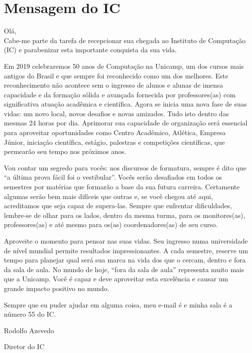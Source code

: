 
\section{Mensagem do IC}

Olá,\\

Cabe-me parte da tarefa de recepcionar sua chegada ao Instituto de Computação 
(IC) e parabenizar esta importante conquista da sua vida.

Em 2019 celebraremos 50 anos de Computação na Unicamp, um dos cursos mais 
antigos do Brasil e que sempre foi reconhecido como um dos melhores. Este 
reconhecimento não acontece sem o ingresso de alunos e alunas de imensa 
capacidade e da formação sólida e avançada fornecida por professores(as) com 
significativa atuação acadêmica e científica. Agora se inicia uma nova fase de 
suas vidas: um novo local, novos desafios e novas amizades. Tudo isto dentro 
das mesmas 24 horas por dia. Aprimorar sua capacidade de organização será 
essencial para aproveitar oportunidades como Centro Acadêmico, Atlética, 
Empresa Júnior, iniciação científica, estágio, palestras e competições 
científicas, que permearão seu tempo nos próximos anos.

Vou contar um segredo para vocês: nos discursos de formatura, sempre é dito que 
“a última prova fácil foi o vestibular”. Vocês serão desafiados em todos os 
semestres por matérias que formarão a base da sua futura carreira. Certamente 
algumas serão bem mais difíceis que outras e, se você chegou até aqui, 
acreditamos que seja capaz de supera-las. Sempre que enfrentar dificuldades, 
lembre-se de olhar para os lados, dentro da mesma turma, para os monitores(as), 
professores(as) e até mesmo para os(as) coordenadores(as) de seu curso.

Aproveite o momento para pensar nas suas vidas. Seu ingresso numa universidade 
de nível mundial permite resultados impressionantes. A cada semestre, reserve 
um tempo para planejar qual será sua marca na vida dos que o cercam, dentro e 
fora da sala de aula. No mundo de hoje, “fora da sala de aula” representa muito 
mais que a Unicamp. Você é capaz e deve aproveitar esta excelência e causar um 
grande impacto positivo no mundo.

Sempre que eu puder ajudar em alguma coisa, meu e-mail é 
 e minha sala é a número 55 do IC.\\


\begin{flushright}
Rodolfo Azevedo

Diretor do IC
\end{flushright}
